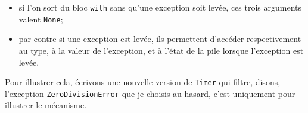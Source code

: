\begin{Shaded}
\begin{Highlighting}[frame=lines,framerule=0.6mm,rulecolor=\color{asisframecolor}]
 \NormalTok{(}
\end{Highlighting}
\end{Shaded}

\begin{itemize}
\tightlist
\item
  si l'on sort du bloc \texttt{with} sans qu'une exception soit levée,
  ces trois arguments valent \texttt{None};
\item
  par contre si une exception est levée, ils permettent d'accéder
  respectivement au type, à la valeur de l'exception, et à l'état de la
  pile lorsque l'exception est levée.
\end{itemize}

    Pour illustrer cela, écrivons une nouvelle version de \texttt{Timer} qui
filtre, disons, l'exception \texttt{ZeroDivisionError} que je choisis au
hasard, c'est uniquement pour illustrer le mécanisme.

